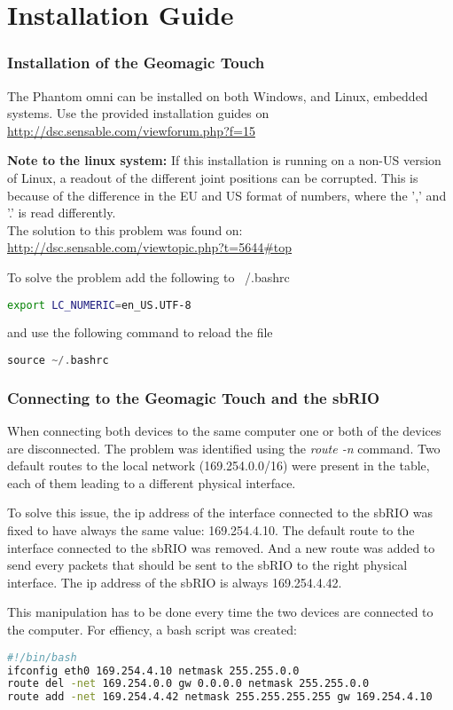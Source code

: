 \chapter{Installation Guide}

\subsection{Installation of the Geomagic Touch}
The Phantom omni can be installed on both Windows, and Linux, embedded systems. 
Use the provided installation guides on\\
\url{http://dsc.sensable.com/viewforum.php?f=15}

\textbf{Note to the linux system:} If this installation is running on a non-US version of Linux, a readout of the different joint positions can be corrupted. This is because of the difference in the EU and US format of numbers, where the ',' and '.' is read differently.\\
The solution to this problem was found on:\\
\url{http://dsc.sensable.com/viewtopic.php?t=5644#top}

To solve the problem add the following to ~/.bashrc
\begin{lstlisting}[language=bash]
export LC_NUMERIC=en_US.UTF-8
\end{lstlisting}
and use the following command to reload the file
\begin{lstlisting}[language=C]
source ~/.bashrc
\end{lstlisting}

\subsection{Connecting to the Geomagic Touch and the sbRIO}

When connecting both devices to the same computer one or both of the devices are disconnected. The problem was identified using the \textit{route -n} command. Two default routes to the local network (169.254.0.0/16) were present in the table, each of them leading to a different physical interface.

To solve this issue, the ip address of the interface connected to the sbRIO was fixed to have always the same value: 169.254.4.10. The default route to the interface connected to the sbRIO was removed. And a new route was added to send every packets that should be sent to the sbRIO to the right physical interface. The ip address of the sbRIO is always 169.254.4.42.

This manipulation has to be done every time the two devices are connected to the computer. For effiency, a bash script was created: 

\begin{lstlisting}[language=bash]
#!/bin/bash
ifconfig eth0 169.254.4.10 netmask 255.255.0.0
route del -net 169.254.0.0 gw 0.0.0.0 netmask 255.255.0.0
route add -net 169.254.4.42 netmask 255.255.255.255 gw 169.254.4.10
\end{lstlisting}